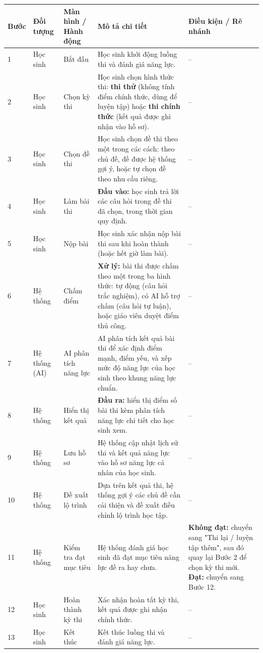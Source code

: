 \documentclass[12pt,a4paper]{article}
\begin{document}
\begin{landscape}
\begin{longtable}{L{1.3cm} L{2.2cm} L{3.1cm} L{10.7cm} L{5.3cm}}
\toprule
{}\textbf{Bước} & \textbf{Đối tượng} & \textbf{Màn hình / Hành động} & \textbf{Mô tả chi tiết} & \textbf{Điều kiện / Rẽ nhánh} \\
\midrule
{} & Học sinh & Bắt đầu & Học sinh khởi động luồng thi và đánh giá năng lực. & -- \\
2 & Học sinh & Chọn kỳ thi & Học sinh chọn hình thức thi: \textbf{thi thử} (không tính điểm chính thức, dùng để luyện tập) hoặc \textbf{thi chính thức} (kết quả được ghi nhận vào hồ sơ). & -- \\
3 & Học sinh & Chọn đề thi & Học sinh chọn đề thi theo một trong các cách: theo chủ đề, đề được hệ thống gợi ý, hoặc tự chọn đề theo nhu cầu riêng. & -- \\
4 & Học sinh & Làm bài thi & \textbf{Đầu vào:} học sinh trả lời các câu hỏi trong đề thi đã chọn, trong thời gian quy định. & -- \\
5 & Học sinh & Nộp bài & Học sinh xác nhận nộp bài thi sau khi hoàn thành (hoặc hết giờ làm bài). & -- \\
6 & Hệ thống & Chấm điểm & \textbf{Xử lý:} bài thi được chấm theo một trong ba hình thức: tự động (câu hỏi trắc nghiệm), có AI hỗ trợ chấm (câu hỏi tự luận), hoặc giáo viên duyệt điểm thủ công. & -- \\
7 & Hệ thống (AI) & AI phân tích năng lực & AI phân tích kết quả bài thi để xác định điểm mạnh, điểm yếu, và xếp mức độ năng lực của học sinh theo khung năng lực chuẩn. & -- \\
8 & Hệ thống & Hiển thị kết quả & \textbf{Đầu ra:} hiển thị điểm số bài thi kèm phân tích năng lực chi tiết cho học sinh xem. & -- \\
9 & Hệ thống & Lưu hồ sơ & Hệ thống cập nhật lịch sử thi và kết quả năng lực vào hồ sơ năng lực cá nhân của học sinh. & -- \\
10 & Hệ thống & Đề xuất lộ trình & Dựa trên kết quả thi, hệ thống gợi ý các chủ đề cần cải thiện và đề xuất điều chỉnh lộ trình học tập. & -- \\
11 & Hệ thống & Kiểm tra đạt mục tiêu & Hệ thống đánh giá học sinh đã đạt mục tiêu năng lực đề ra hay chưa. & \textbf{Không đạt:} chuyển sang "Thi lại / luyện tập thêm", sau đó quay lại Bước 2 để chọn kỳ thi mới. \newline \textbf{Đạt:} chuyển sang Bước 12. \\
12 & Học sinh & Hoàn thành kỳ thi & Xác nhận hoàn tất kỳ thi, kết quả được ghi nhận chính thức. & -- \\
13 & Học sinh & Kết thúc & Kết thúc luồng thi và đánh giá năng lực. & -- \\
\bottomrule
\end{longtable}
\end{landscape}
\end{document}
